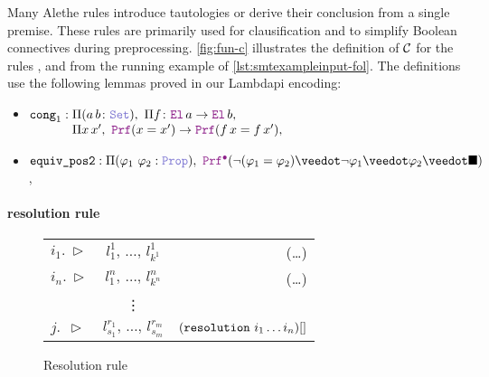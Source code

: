 Many Alethe rules introduce tautologies or derive their conclusion from a single premise.
%
These rules are primarily used for clausification and to simplify Boolean connectives during
preprocessing.
%
\cref{fig:fun-c} illustrates the definition of $\cal{C}$ for the rules ,  and  from the running example of \cref{lst:smtexampleinput-fol}.
The definitions use the following lemmas proved in our Lambdapi encoding:
\begin{itemize}
\item $\kw{cong}_1 :
    \begin{array}[t]{@{}l@{}}
        \Pi (a\,b \colon \set),\ \Pi f \colon \el\,a \ra \el\,b, \\
        \Pi x\,x',\ \prf (x = x') \ra \prf (f\,x = f\,x'),
    \end{array}$
\item $\kw{equiv\_pos2} : \Pi (\varphi_1~\varphi_2: \prop),\ \pid (\neg (\varphi_1 = \varphi_2) \veedot \neg \varphi_1 \veedot \varphi_2 \veedot \nil )$,
\end{itemize}



\paragraph{resolution rule}

\begin{figure}[t]
  \centering
  \begin{tabular}{l c r}
  $i_1.~\triangleright$  & \qquad $l_1^1,\, \dots,\, l_{k^1}^1$ \qquad & (\dots)  \\
  $i_n.~\triangleright$  & \qquad $l_1^n,\, \dots,\, l_{k^n}^n$ \qquad & (\dots) \\
    & \vdots  &  \\
  $j.~~\triangleright$  & \qquad $l_{s_1}^{r_1},\, \dots,\, l_{s_m}^{r_m}$ \qquad & $(\kw{resolution}~i_1 \dots i_n)[]$
  \end{tabular}
  \caption{Resolution rule}
  \label{fig:resolution-rule}
\end{figure}


